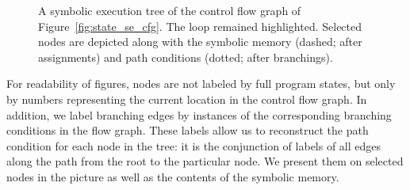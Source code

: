 \begin{figure}[htb]
\begin{center}
\end{center}
  \caption{A symbolic execution tree of the control flow graph of
  Figure~\ref{fig:state_se_cfg}. The loop remained highlighted. Selected nodes
  are depicted along with the symbolic memory (dashed; after assignments) and
  path conditions (dotted; after branchings).}
  \label{fig:state_se_tree}
\end{figure}
For readability of figures, nodes are not labeled by full program states, but
only by numbers representing the current location in the control flow graph.
In addition, we label
branching edges by instances of the corresponding branching conditions in the
flow graph. These labels allow us to reconstruct the path condition for each
node in the tree: it is the conjunction of labels of all edges along the path
from the root to the particular node. We present them on selected nodes in the
picture as well as the contents of the symbolic memory.

